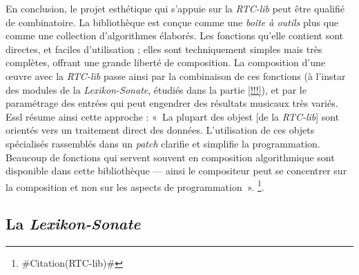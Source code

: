 \documentclass[a4paper,12pt]{article}
\newcommand{\guill}[1]{«~#1~»}
\newcommand{\zitat}[2]{\#Citation(#2)\#}
\begin{document}
En conclusion, le projet esthétique qui s'appuie sur la \emph{RTC-lib} peut être qualifié de combinatoire. La bibliothèque est conçue comme une \emph{boîte à outils} plus que comme une collection d'algorithmes élaborés. Les fonctions qu'elle contient sont directes, et faciles d'utilisation ; elles sont techniquement simples mais très complètes, offrant une grande liberté de composition. La composition d'une œuvre avec la \emph{RTC-lib} passe ainsi par la combinaison de ces fonctions (à l'instar des modules de la \emph{Lexikon-Sonate}, étudiés dans la partie \ref{!!!}), et par le paramétrage des entrées qui peut engendrer des résultats musicaux très variés. Essl résume ainsi cette approche : \guill{La plupart des objest [de la \emph{RTC-lib}] sont orientés vers un traitement direct des données. L'utilisation de ces objets spécialisés rassemblés dans un \emph{patch} clarifie et simplifie la programmation. Beaucoup de fonctions qui servent souvent en composition algorithmique sont disponible dans cette bibliothèque --- ainsi le compositeur peut se concentrer sur la composition et non sur les aspects de programmation}.
\footnote{\zitat{Most of these objects are geared towards straightforward processing of data. By using these specialized objects together in a patch, programming becomes much more clear and easy. Many functions that are often useful in algorithmic composition are provided with this library --- therefore the composer could concentrate rather on the composition than the programming aspects.}
{RTC-lib}}.


\subsection{La \emph{Lexikon-Sonate}}
\end{document}
